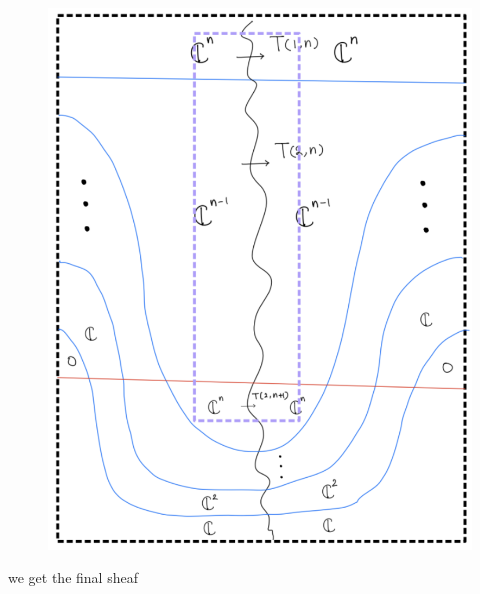 \begin{enumerate}[label=(\roman*)]
\begin{enumerate}[label=(Step \arabic*)]
\begin{figure}[H]
    \centering
    \includegraphics[scale = 0.95]{diagrams/cobord6/6.png}
    \caption{}
    \label{fig:your-label}
\end{figure}
\pagebreak 
we get the final sheaf


\end{enumerate}
\end{enumerate}
